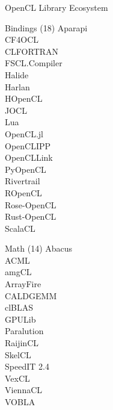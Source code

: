 

\begin{frame}{OpenCL Library Ecosystem}

 \begin{minipage}{0.24\textwidth}
 \begin{block}{Bindings (18)}
Aparapi\\
CF4OCL\\
CLFORTRAN\\
FSCL.Compiler\\
Halide\\
Harlan\\
HOpenCL\\
JOCL\\
Lua\\
OpenCL.jl\\
OpenCLIPP\\
OpenCLLink\\
PyOpenCL\\
Rivertrail\\
ROpenCL\\
Rose-OpenCL\\
Rust-OpenCL\\
ScalaCL\\
\end{block}  
 \end{minipage}
 \begin{minipage}{0.24\textwidth}
 \begin{block}{Math (14)}
Abacus\\
ACML\\
amgCL\\
ArrayFire\\
CALDGEMM\\
clBLAS\\
GPULib\\
Paralution\\
RaijinCL\\
SkelCL\\
SpeedIT 2.4\\
VexCL\\
ViennaCL\\
VOBLA\\  
 \\
 \\
 \\
 \\
 \end{block}
  \end{minipage}
 \begin{minipage}{0.24\textwidth}

\end{minipage}
\end{frame}

